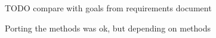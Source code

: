TODO compare with goals from requirements document

Porting the methods was ok, but depending on methods 